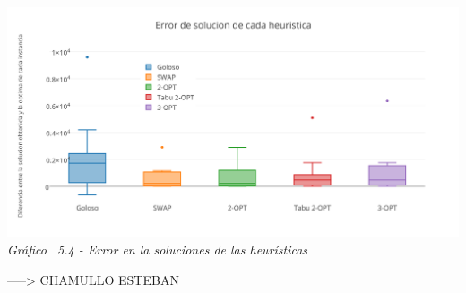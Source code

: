 	\vspace*{0.3cm} \vspace*{0.3cm}
  \begin{center}
 \includegraphics[scale=0.5]{./EJ5/errorporalgoritmo.png}\\
 {\textit{Gráfico \ 5.4 - Error en la soluciones de las heur\'isticas}}
  \end{center}
  \vspace*{0.3cm}
	
	-----> CHAMULLO ESTEBAN